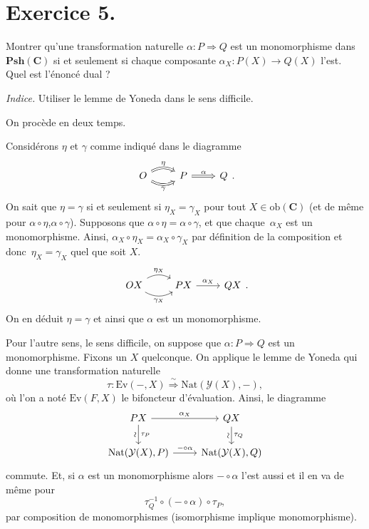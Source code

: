 \documentclass{../../td}
\begin{document}
  \chapter{Exercice 5.}
  \begin{slshape}
    \color{deepblue}
    Montrer qu'une transformation naturelle $\alpha : P \Rightarrow Q$ est un monomorphisme dans  $\mathbf{Psh}(\mathbf{C})$ si et seulement si chaque composante $\alpha_X : P(X) \to Q(X)$ l'est. Quel est l'énoncé dual ?

    \textit{Indice.} Utiliser le lemme de Yoneda dans le sens difficile.
  \end{slshape}

  On procède en deux temps.

  Considérons $\eta$ et  $\gamma$ comme indiqué dans le diagramme 
  \[
  \begin{tikzcd}
    O \arrow[Rightarrow,bend left]{r}{\eta}  \arrow[Rightarrow,bend right,swap]{r}{\gamma} & P \arrow[Rightarrow]{r}{\alpha} & Q
  \end{tikzcd}
  .\]
  On sait que $\eta = \gamma$ si et seulement si $\eta_X = \gamma_X$ pour tout $X \in \mathrm{ob}(\mathbf{C})$ (et de même pour $\alpha \circ \eta$,$\alpha \circ \gamma$).
  Supposons que $\alpha \circ \eta = \alpha \circ \gamma$, et que chaque~$\alpha_X$ est un monomorphisme.
  Ainsi, $\alpha_X \circ \eta_X = \alpha_X \circ \gamma_X$ par définition de la composition et donc~$\eta_X = \gamma_X$ quel que soit $X$.
  \[
  \begin{tikzcd}
    O X \arrow[bend left]{r}{\eta_X} \arrow[bend right,swap]{r}{\gamma_X} & P X \arrow{r}{\alpha_X} & Q X
  \end{tikzcd}
  .\] 
  On en déduit $\eta = \gamma$ et ainsi que $\alpha$ est un monomorphisme.

  Pour l'autre sens, le sens difficile, on suppose que $\alpha : P \Rightarrow Q$ est un monomorphisme.
  Fixons un $X$ quelconque.
  On applique le lemme de Yoneda qui donne une transformation naturelle \[\tau : \mathrm{Ev}(-, X) \overset \sim \Rightarrow \mathrm{Nat}(\mathcal{Y}(X), -),\] où l'on a noté $\mathrm{Ev}(F, X)$ le bifoncteur d'évaluation.
  Ainsi, le diagramme \[
  \begin{tikzcd}
    P X \arrow{r}{\alpha_X} \arrow{d}{\tau_P}[swap]{\vertical\sim} & Q X \arrow{d}{\tau_Q}[swap]{\vertical\sim}\\
    \mathrm{Nat}(\mathcal{Y}(X), P) \arrow{r}{- \circ \alpha} & \mathrm{Nat}(\mathcal{Y}(X), Q)
  \end{tikzcd}
  \]
  commute.
  Et, si $\alpha$ est un monomorphisme alors $- \circ \alpha$ l'est aussi et il en va de même pour  \[
    \tau_Q^{-1}\circ (- \circ \alpha) \circ \tau_P
  ,\] par composition de monomorphismes (isomorphisme implique monomorphisme).
\end{document}
